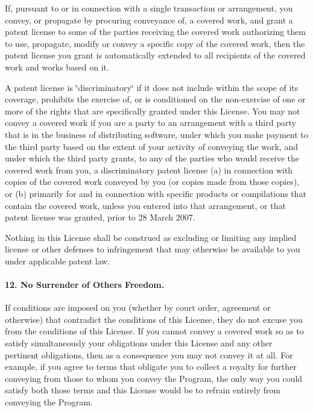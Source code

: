 If, pursuant to or in connection with a single transaction or arrangement, you convey, or propagate by procuring conveyance of, a covered work, and grant a patent license to some of the parties receiving the covered work authorizing them to use, propagate, modify or convey a specific copy of the covered work, then the patent license you grant is automatically extended to all recipients of the covered work and works based on it.

A patent license is \char`\"{}discriminatory\char`\"{} if it does not include within the scope of its coverage, prohibits the exercise of, or is conditioned on the non-\/exercise of one or more of the rights that are specifically granted under this License. You may not convey a covered work if you are a party to an arrangement with a third party that is in the business of distributing software, under which you make payment to the third party based on the extent of your activity of conveying the work, and under which the third party grants, to any of the parties who would receive the covered work from you, a discriminatory patent license (a) in connection with copies of the covered work conveyed by you (or copies made from those copies), or (b) primarily for and in connection with specific products or compilations that contain the covered work, unless you entered into that arrangement, or that patent license was granted, prior to 28 March 2007.

Nothing in this License shall be construed as excluding or limiting any implied license or other defenses to infringement that may otherwise be available to you under applicable patent law.

\paragraph*{12. No Surrender of Others\textquotesingle{} Freedom.}

If conditions are imposed on you (whether by court order, agreement or otherwise) that contradict the conditions of this License, they do not excuse you from the conditions of this License. If you cannot convey a covered work so as to satisfy simultaneously your obligations under this License and any other pertinent obligations, then as a consequence you may not convey it at all. For example, if you agree to terms that obligate you to collect a royalty for further conveying from those to whom you convey the Program, the only way you could satisfy both those terms and this License would be to refrain entirely from conveying the Program.

